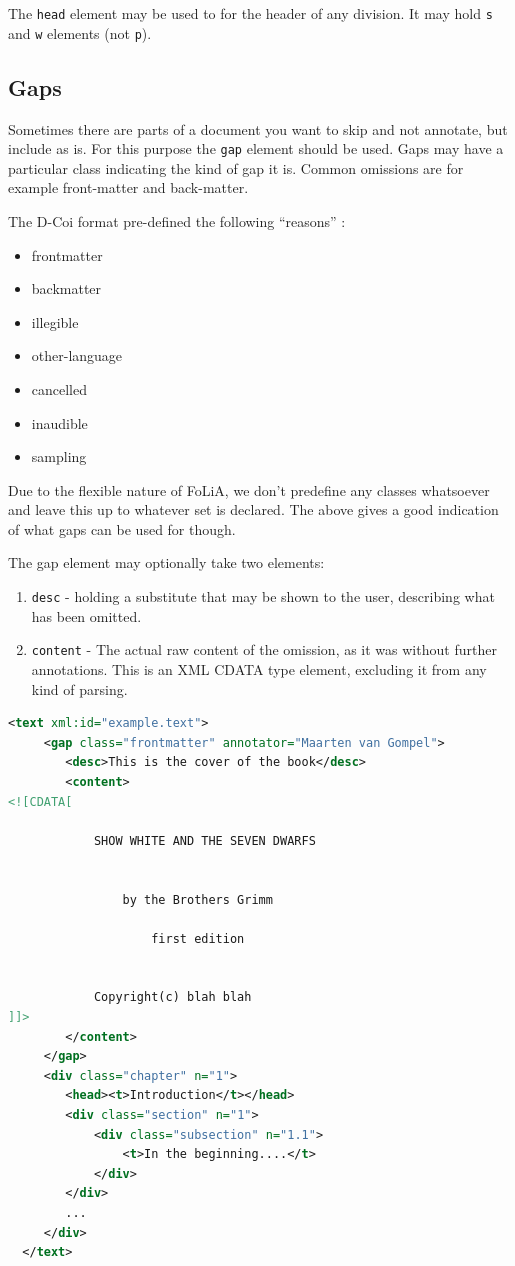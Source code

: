 \documentclass[a4paper,12pt]{report}
\begin{document}
The \texttt{head} element may be used to for the header of any division. It may hold \texttt{s} and \texttt{w} elements (not \texttt{p}).


\subsection{Gaps}

Sometimes there are parts of a document you want to skip and not annotate, but include as is. For this purpose the \texttt{gap} element should be used. Gaps may have a particular class indicating the kind of gap it is. Common omissions are for example front-matter and back-matter.

The D-Coi format pre-defined the following ``reasons'' \cite{DCOI}:

\begin{itemize}
\item frontmatter
\item backmatter
\item illegible
\item other-language
\item cancelled
\item inaudible
\item sampling
\end{itemize}

Due to the flexible nature of FoLiA, we don't predefine any classes whatsoever and leave this up to whatever set is declared. The above gives a good indication of what gaps can be used for though. 

The gap element may optionally take two elements:

\begin{enumerate}
\item \texttt{desc} - holding a substitute that may be shown to the user, describing what has been omitted.
\item \texttt{content} - The actual raw content of the omission, as it was without further annotations. This is an XML CDATA type element, excluding it from any kind of parsing.
\end{enumerate}


\begin{lstlisting}[language=xml]
  <text xml:id="example.text">
     <gap class="frontmatter" annotator="Maarten van Gompel">
        <desc>This is the cover of the book</desc>
        <content>
<![CDATA[        
    
            SHOW WHITE AND THE SEVEN DWARFS
            
            
                by the Brothers Grimm
                
                    first edition
                     
            
            Copyright(c) blah blah
]]>
        </content>
     </gap>
     <div class="chapter" n="1">
        <head><t>Introduction</t></head>
        <div class="section" n="1">
            <div class="subsection" n="1.1">
                <t>In the beginning....</t>
            </div>
        </div>
        ...
     </div>
  </text>
\end{lstlisting}
\end{document}
